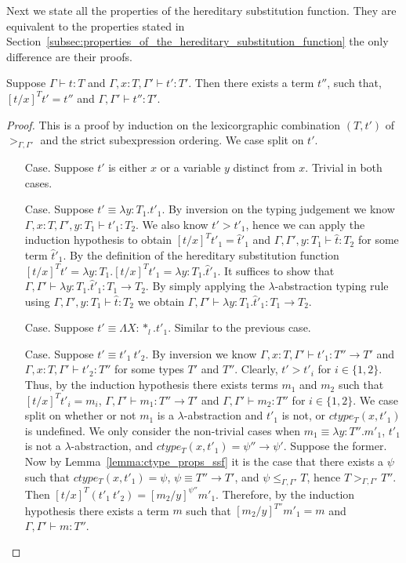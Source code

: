 \noindent Next we state all the properties of the hereditary
substitution function.  They are equivalent to the properties stated
in
Section~\ref{subsec:properties_of_the_hereditary_substitution_function}
the only difference are their proofs.
\begin{lemma}
  \label{lemma:total_ssf}
  Suppose $\Gamma \vdash t : T$ and $\Gamma, x:T, \Gamma' \vdash t':T'$. Then
  there exists a term $t''$, such that, $[t/x]^T t' = t''$ and $\Gamma,\Gamma' \vdash t'':T'$.
\end{lemma}
\begin{proof}
  This is a proof by induction on the lexicorgraphic combination $(T, t')$ of $>_{\Gamma,\Gamma'}$ and
the strict subexpression ordering.  We case split on $t'$.

\begin{itemize}
\item[Case.] Suppose $t'$ is either $x$ or a variable $y$ distinct from $x$.  
  Trivial in both cases.
  
\item[Case.] Suppose $t' \equiv \lambda y:T_1.t'_1$.  By inversion on the
  typing judgement we know $\Gamma,x:T,\Gamma',y:T_1 \vdash t'_1:T_2$.
  We also know $t' > t'_1$, hence we can apply the induction hypothesis to obtain
  $[t/x]^T t'_1 = \hat{t}'_1$ and $\Gamma,\Gamma',y:T_1 \vdash \hat{t}:T_2$
  for some term $\hat{t}'_1$.  By the definition of the hereditary substitution function 
  $[t/x]^T t' = \lambda y:T_1.[t/x]^T t'_1 = \lambda y:T_1.\hat{t}'_1$.  It suffices
  to show that $\Gamma,\Gamma' \vdash \lambda y:T_1.\hat{t}'_1:T_1 \to T_2$.  
  By simply applying the $\lambda$-abstraction typing rule using
  $\Gamma,\Gamma',y:T_1 \vdash \hat{t}:T_2$ we obtain 
  $\Gamma,\Gamma' \vdash \lambda y:T_1.\hat{t}'_1:T_1 \to T_2$.
  
\item[Case.] Suppose $t' \equiv \Lambda X:*_l.t'_1$.  Similar to the previous case.
  
\item[Case.] Suppose $t' \equiv t'_1\ t'_2$.  By inversion we know
  $\Gamma, x:T, \Gamma' \vdash t'_1 : T'' \to T'$ and
  $\Gamma, x:T, \Gamma' \vdash t'_2 : T''$ for some types $T'$ and $T''$.
  Clearly, $t' > t'_i$ for $i \in \{1,2\}$.  Thus, by the induction hypothesis
  there exists terms $m_1$ and $m_2$ such that $[t/x]^T t'_i = m_i$,
  $\Gamma, \Gamma' \vdash m_1 : T'' \to T'$ and
  $\Gamma, \Gamma' \vdash m_2 : T''$ for
  $i \in \{1,2\}$.  We case split on whether or not $m_1$ is a $\lambda$-abstraction
  and $t'_1$ is not, or $ctype_T(x,t'_1)$ is undefined.  
  We only consider the non-trivial cases when 
  $m_1 \equiv \lambda y:T''.m'_1$, $t'_1$ is not a $\lambda$-abstraction, and 
  $ctype_T(x,t'_1) = \psi'' \to \psi'$.  Suppose the former.  
  Now by Lemma~\ref{lemma:ctype_props_ssf} it is the case that 
  there exists a $\psi$ such that $ctype_T(x,t'_1) = \psi$, 
  $\psi \equiv T'' \to T'$, and $\psi \leq_{\Gamma,\Gamma'} T$, hence
  $T >_{\Gamma,\Gamma'} T''$.
  Then $[t/x]^T (t'_1\ t'_2) = [m_2/y]^{\psi''} m'_1$.  
  Therefore, by the induction hypothesis there exists a 
  term $m$ such that $[m_2/y]^{T''} m'_1 = m$ and $\Gamma,\Gamma' \vdash m:T''$.
  

\end{itemize}
\end{proof}
